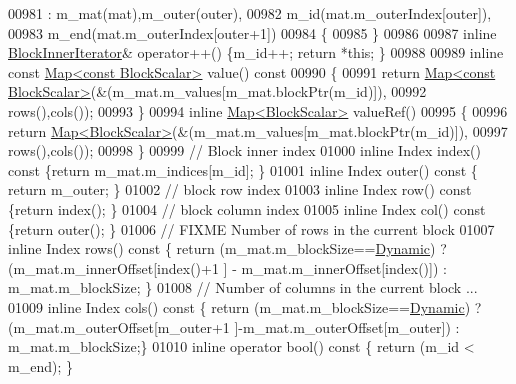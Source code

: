 \begin{DoxyCode}
00981     : m\_mat(mat),m\_outer(outer),
00982       m\_id(mat.m\_outerIndex[outer]),
00983       m\_end(mat.m\_outerIndex[outer+1])
00984     \{
00985     \}
00986 
00987     \textcolor{keyword}{inline} \hyperlink{class_eigen_1_1_block_sparse_matrix_1_1_block_inner_iterator}{BlockInnerIterator}& operator++() \{m\_id++; \textcolor{keywordflow}{return} *\textcolor{keyword}{this}; \}
00988 
00989     \textcolor{keyword}{inline} \textcolor{keyword}{const} \hyperlink{group___core___module_class_eigen_1_1_map}{Map<const BlockScalar>} value()\textcolor{keyword}{ const}
00990 \textcolor{keyword}{    }\{
00991       \textcolor{keywordflow}{return} \hyperlink{group___core___module_class_eigen_1_1_map}{Map<const BlockScalar>}(&(m\_mat.m\_values[m\_mat.blockPtr(m\_id)]),
00992           rows(),cols());
00993     \}
00994     \textcolor{keyword}{inline} \hyperlink{group___core___module_class_eigen_1_1_map}{Map<BlockScalar>} valueRef()
00995     \{
00996       \textcolor{keywordflow}{return} \hyperlink{group___core___module_class_eigen_1_1_map}{Map<BlockScalar>}(&(m\_mat.m\_values[m\_mat.blockPtr(m\_id)]),
00997           rows(),cols());
00998     \}
00999     \textcolor{comment}{// Block inner index}
01000     \textcolor{keyword}{inline} Index index()\textcolor{keyword}{ const }\{\textcolor{keywordflow}{return} m\_mat.m\_indices[m\_id]; \}
01001     \textcolor{keyword}{inline} Index outer()\textcolor{keyword}{ const }\{ \textcolor{keywordflow}{return} m\_outer; \}
01002     \textcolor{comment}{// block row index}
01003     \textcolor{keyword}{inline} Index row()\textcolor{keyword}{ const  }\{\textcolor{keywordflow}{return} index(); \}
01004     \textcolor{comment}{// block column index}
01005     \textcolor{keyword}{inline} Index col()\textcolor{keyword}{ const }\{\textcolor{keywordflow}{return} outer(); \}
01006     \textcolor{comment}{// FIXME Number of rows in the current block}
01007     \textcolor{keyword}{inline} Index rows()\textcolor{keyword}{ const }\{ \textcolor{keywordflow}{return} (m\_mat.m\_blockSize==\hyperlink{namespace_eigen_ad81fa7195215a0ce30017dfac309f0b2}{Dynamic}) ? (m\_mat.m\_innerOffset[index()+1
      ] - m\_mat.m\_innerOffset[index()]) : m\_mat.m\_blockSize; \}
01008     \textcolor{comment}{// Number of columns in the current block ...}
01009     \textcolor{keyword}{inline} Index cols()\textcolor{keyword}{ const }\{ \textcolor{keywordflow}{return} (m\_mat.m\_blockSize==\hyperlink{namespace_eigen_ad81fa7195215a0ce30017dfac309f0b2}{Dynamic}) ? (m\_mat.m\_outerOffset[m\_outer+1
      ]-m\_mat.m\_outerOffset[m\_outer]) : m\_mat.m\_blockSize;\}
01010     \textcolor{keyword}{inline} \textcolor{keyword}{operator} bool()\textcolor{keyword}{ const }\{ \textcolor{keywordflow}{return} (m\_id < m\_end); \}

\end{DoxyCode}
